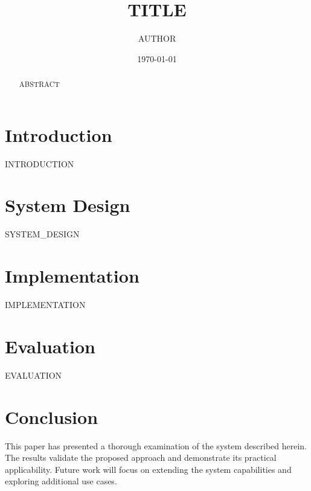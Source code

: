 \documentclass[12pt,a4paper]{article}
\title{\textbf{{{TITLE}}}}
\author{{{AUTHOR}}}
\date{\today}
\begin{document}
\maketitle
\thispagestyle{empty}

\begin{abstract}
{{ABSTRACT}}
\end{abstract}

\newpage
\tableofcontents
\newpage

\doublespacing

\section{Introduction}
{{INTRODUCTION}}

\section{System Design}
{{SYSTEM_DESIGN}}

\section{Implementation}
{{IMPLEMENTATION}}

\section{Evaluation}
{{EVALUATION}}

\section{Conclusion}
This paper has presented a thorough examination of the system described herein. The results validate the proposed approach and demonstrate its practical applicability. Future work will focus on extending the system capabilities and exploring additional use cases.

\newpage


\end{document}
